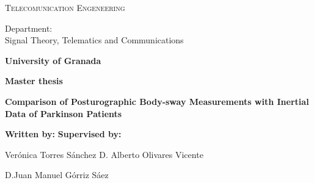 \begin{titlepage}
\label{ch:cover}
\begin{center}

{\Large\textsc{Telecomunication Engeneering}}


Department:  \\ Signal Theory, Telematics and Communications

\textbf{University of Granada}


\vspace{0.5cm}

\begin{figure}[h]
	\centering
	\label{fig:ugr}
\end{figure}


\vspace{0.5cm}
\textbf{Master thesis}


\vspace{0.9cm}


{\Huge\textbf{Comparison of Posturographic Body-sway Measurements with Inertial Data of Parkinson Patients }}


\end{center}


\vspace{1.5cm}
\textbf{Written by:}  \hfill \textbf{Supervised by:}

Ver\'onica Torres S\'anchez \hfill D. Alberto Olivares Vicente

							\hfill	   D.Juan Manuel Górriz Sáez



\end{titlepage}
